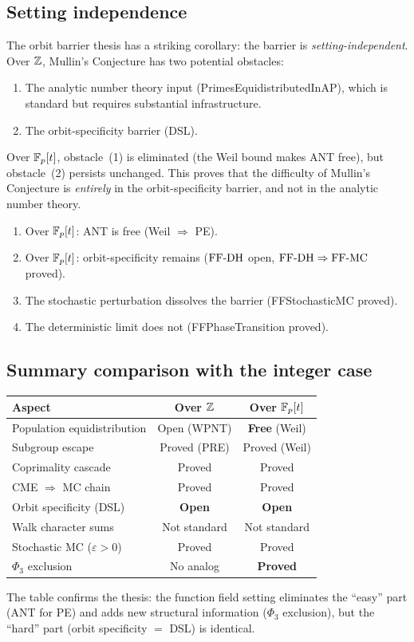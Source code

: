 \subsection{Setting independence}

The orbit barrier thesis has a striking corollary: the barrier is
\emph{setting-independent}. Over $\mathbb{Z}$, Mullin's Conjecture has two
potential obstacles:
\begin{enumerate}
  \item The analytic number theory input (PrimesEquidistributedInAP),
    which is standard but requires substantial infrastructure.
  \item The orbit-specificity barrier (DSL).
\end{enumerate}
Over $\mathbb{F}_p[t]$, obstacle~(1) is eliminated (the Weil bound makes ANT free),
but obstacle~(2) persists unchanged. This proves that the difficulty of
Mullin's Conjecture is \emph{entirely} in the orbit-specificity barrier,
and not in the analytic number theory.

\begin{theorem}\label{thm:setting-independent}
\begin{enumerate}[label=(\roman*)]
  \item Over $\mathbb{F}_p[t]$: ANT is free (Weil $\Rightarrow$ PE).
  \item Over $\mathbb{F}_p[t]$: orbit-specificity remains ($\mathrm{FF\text{-}DH}$ open, $\mathrm{FF\text{-}DH}
    \Rightarrow \mathrm{FF\text{-}MC}$ proved).
  \item The stochastic perturbation dissolves the barrier (FFStochasticMC
    proved).
  \item The deterministic limit does not (FFPhaseTransition proved).
\end{enumerate}
\end{theorem}

\subsection{Summary comparison with the integer case}

\begin{center}
\renewcommand{\arraystretch}{1.3}
\begin{tabular}{lcc}
\toprule
\textbf{Aspect} & \textbf{Over $\mathbb{Z}$} & \textbf{Over $\mathbb{F}_p[t]$} \\
\midrule
Population equidistribution & Open (WPNT) & \textbf{Free} (Weil) \\
Subgroup escape & Proved (PRE) & Proved (Weil) \\
Coprimality cascade & Proved & Proved \\
CME $\Rightarrow$ MC chain & Proved & Proved \\
Orbit specificity (DSL) & \textbf{Open} & \textbf{Open} \\
Walk character sums & Not standard & Not standard \\
Stochastic MC ($\varepsilon > 0$) & Proved & Proved \\
$\Phi_3$ exclusion & No analog & \textbf{Proved} \\
\bottomrule
\end{tabular}
\end{center}

The table confirms the thesis: the function field setting eliminates the
``easy'' part (ANT for PE) and adds new structural information ($\Phi_3$
exclusion), but the ``hard'' part (orbit specificity $=$ DSL) is identical.
